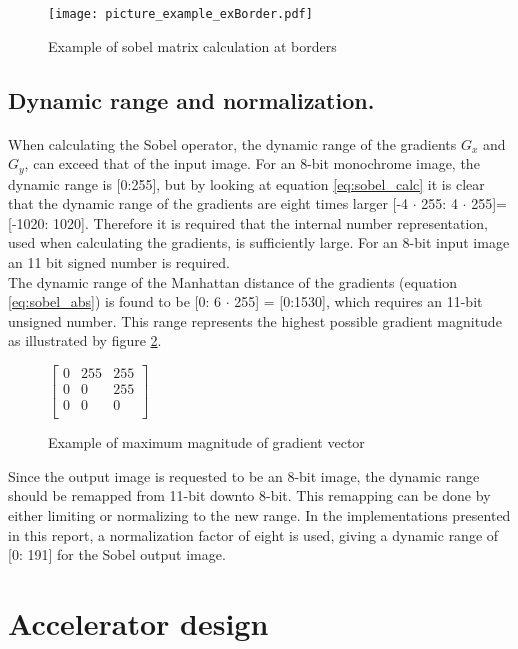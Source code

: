 \begin{figure}[H]
	\centering
	\texttt{[image: picture\_example\_exBorder.pdf]}
	\caption{Example of sobel matrix calculation at borders}
	\label{fig:pic_matrix_exBorder}
\end{figure}  

\subsection{Dynamic range and normalization.}
\paragraph*{}
When calculating the Sobel operator, the dynamic range of the gradients $G_x$ and $G_y$, can exceed that of the input image.
For an 8-bit monochrome image, the dynamic range is [0:255], but by looking at equation \ref{eq:sobel_calc} it is clear that the  dynamic range of the gradients are eight times larger [-4 $\cdot$ 255: 4 $\cdot$ 255]=[-1020: 1020]. Therefore it is required that the internal number representation, used when calculating the gradients, is sufficiently large.
For an 8-bit input image an 11 bit signed number is required. \\
The dynamic range of the Manhattan distance of the gradients (equation \ref{eq:sobel_abs}) is found to be [0: 6 $\cdot$ 255] = [0:1530], which requires an 11-bit unsigned number. This range represents the highest possible gradient magnitude as illustrated by figure \ref{fig:sobel_MaxRange}.

\begin{figure}[H]
\centering
$\left[ 
\begin{array}{ccc}
	0 & 255 & 255\\
    0 & 0 & 255\\
    0 & 0 & 0\\
\end{array} \right]$
\caption{Example of maximum magnitude of gradient vector}
\label{fig:sobel_MaxRange}
\end{figure}

Since the output image is requested to be an 8-bit image, the dynamic range should be remapped from 11-bit downto 8-bit. This remapping can be done by either limiting or normalizing to the new range. In the implementations presented in this report, a normalization factor of eight is used, giving a dynamic range of [0: 191] for the Sobel output image.


\section{Accelerator design} 
\label{sec:AccDesign}
